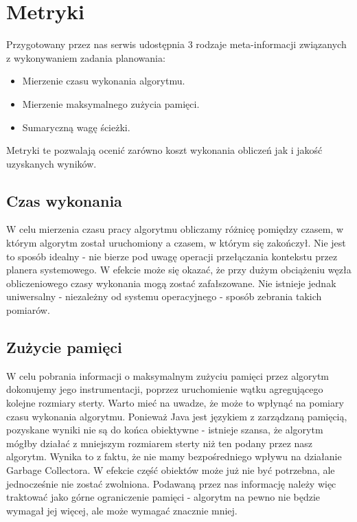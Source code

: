 \section{Metryki}

Przygotowany przez nas serwis udostępnia 3 rodzaje meta-informacji związanych z wykonywaniem zadania planowania:
\begin{itemize}
	\item Mierzenie czasu wykonania algorytmu.
	\item Mierzenie maksymalnego zużycia pamięci.
	\item Sumaryczną wagę ścieżki.
\end{itemize}

Metryki te pozwalają ocenić zarówno koszt wykonania obliczeń jak i jakość uzyskanych wyników.

\subsection{Czas wykonania}

W celu mierzenia czasu pracy algorytmu obliczamy różnicę pomiędzy czasem, w którym algorytm został uruchomiony a czasem, w którym się zakończył.
Nie jest to sposób idealny - nie bierze pod uwagę operacji przełączania kontekstu przez planera systemowego.
W efekcie może się okazać, że przy dużym obciążeniu węzła obliczeniowego czasy wykonania mogą zostać zafałszowane.
Nie istnieje jednak uniwersalny - niezależny od systemu operacyjnego - sposób zebrania takich pomiarów.

\subsection{Zużycie pamięci}

W celu pobrania informacji o maksymalnym zużyciu pamięci przez algorytm dokonujemy jego instrumentacji, poprzez uruchomienie wątku agregującego kolejne rozmiary sterty.
Warto mieć na uwadze, że może to wpłynąć na pomiary czasu wykonania algorytmu.
Ponieważ Java jest językiem z zarządzaną pamięcią, pozyskane wyniki nie są do końca obiektywne - istnieje szansa, że algorytm mógłby działać z mniejszym rozmiarem sterty niż ten podany przez nasz algorytm.
Wynika to z faktu, że nie mamy bezpośredniego wpływu na działanie Garbage Collectora.
W efekcie część obiektów może już nie być potrzebna, ale jednocześnie nie zostać zwolniona.
Podawaną przez nas informację należy więc traktować jako górne ograniczenie pamięci - algorytm na pewno nie będzie wymagał jej więcej, ale może wymagać znacznie mniej.

